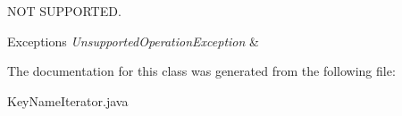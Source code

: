 N\+OT S\+U\+P\+P\+O\+R\+T\+ED. 


\begin{DoxyExceptions}{Exceptions}
{\em Unsupported\+Operation\+Exception} & \\
\hline
\end{DoxyExceptions}


The documentation for this class was generated from the following file\+:\begin{DoxyCompactItemize}
\item 
Key\+Name\+Iterator.\+java\end{DoxyCompactItemize}
